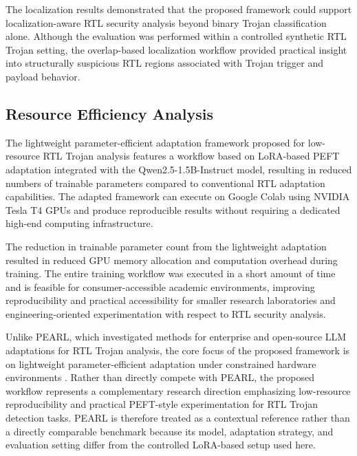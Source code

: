 \documentclass[conference]{IEEEtran}
\begin{document}
The localization results demonstrated that the proposed framework could support localization-aware RTL security analysis beyond binary Trojan classification alone. Although the evaluation was performed within a controlled synthetic RTL Trojan setting, the overlap-based localization workflow provided practical insight into structurally suspicious RTL regions associated with Trojan trigger and payload behavior.


\subsection{Resource Efficiency Analysis}
\label{subsec:resource_efficiency}

The lightweight parameter-efficient adaptation framework proposed for low-resource RTL Trojan analysis features a workflow based on LoRA-based PEFT adaptation integrated with the Qwen2.5-1.5B-Instruct model, resulting in reduced numbers of trainable parameters compared to conventional RTL adaptation capabilities. The adapted framework can execute on Google Colab using NVIDIA Tesla T4 GPUs and produce reproducible results without requiring a dedicated high-end computing infrastructure.

The reduction in trainable parameter count from the lightweight adaptation resulted in reduced GPU memory allocation and computation overhead during training. The entire training workflow was executed in a short amount of time and is feasible for consumer-accessible academic environments, improving reproducibility and practical accessibility for smaller research laboratories and engineering-oriented experimentation with respect to RTL security analysis.

Unlike PEARL, which investigated methods for enterprise and open-source LLM adaptations for RTL Trojan analysis, the core focus of the proposed framework is on lightweight parameter-efficient adaptation under constrained hardware environments \cite{kundu2025pearl,lora,qlora}. Rather than directly compete with PEARL, the proposed workflow represents a complementary research direction emphasizing low-resource reproducibility and practical PEFT-style experimentation for RTL Trojan detection tasks. PEARL is therefore treated as a contextual reference rather than a directly comparable benchmark because its model, adaptation strategy, and evaluation setting differ from the controlled LoRA-based setup used here.
\end{document}
